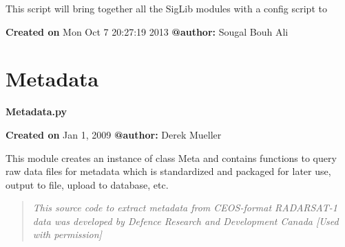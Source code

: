 \documentclass[letterpaper,10pt,english]{sphinxmanual}
\begin{document}
This script will bring together all the SigLib modules with a config script to

\textbf{Created on} Mon Oct  7 20:27:19 2013 \textbf{@author:} Sougal Bouh Ali


\section{Metadata}
\label{code:module-Metadata}\label{code:metadata}
\textbf{Metadata.py}

\textbf{Created on} Jan 1, 2009 \textbf{@author:} Derek Mueller

This module creates an instance of class Meta and contains functions to
query raw data files for metadata which is standardized and packaged for
later use, output to file, upload to database, etc.
\begin{quote}

\emph{This source code to extract metadata from CEOS-format RADARSAT-1 
data was developed by Defence Research and Development Canada
{[}Used with permission{]}}
\end{quote}
\end{document}
